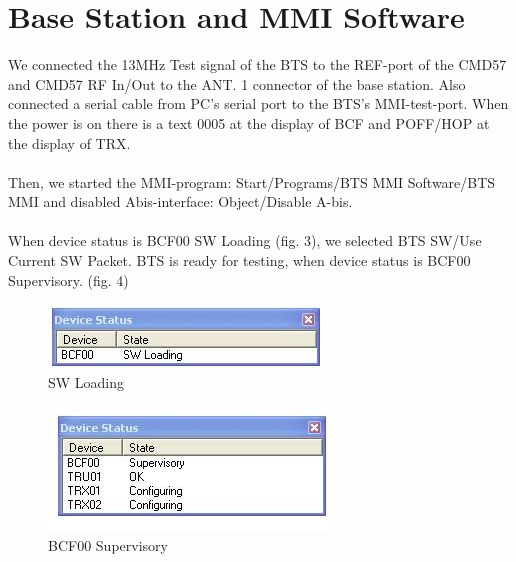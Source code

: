 \documentclass[english]{article}
\begin{document}
\section{Base Station and MMI Software}
We connected the 13MHz Test signal of the BTS to the REF-port of the CMD57 and CMD57 RF In/Out to the ANT. 1 connector of the base station. Also connected a serial cable from PC’s serial port to the BTS’s MMI-test-port. When the power is on there is a text 0005 at the display of BCF and POFF/HOP at the display of TRX.\\\\
Then, we started the MMI-program: Start/Programs/BTS MMI Software/BTS MMI and disabled Abis-interface: Object/Disable A-bis.\\\\
When device status is BCF00 SW Loading (fig. 3), we selected BTS SW/Use Current SW Packet. BTS is ready for testing, when device status is BCF00 Supervisory. (fig. 4)
\begin{figure}
\centerline{\includegraphics[scale=1]{GSM/Pic3}}
\caption{SW Loading}
\end{figure}
\begin{figure}
\centerline{\includegraphics[scale=1]{GSM/Pic4}}
\caption{BCF00 Supervisory}
\end{figure}
\end{document}
